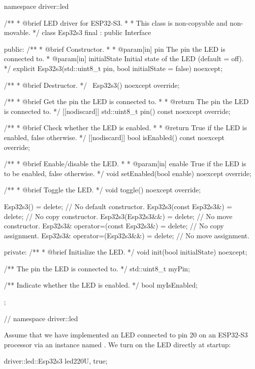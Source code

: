 \begin{cppcode}
namespace driver::led
{
/**
 * @brief LED driver for ESP32-S3.
 *
 *        This class is non-copyable and non-movable.
 */
class Esp32s3 final : public Interface
{
public:
    /**
     * @brief Constructor.
     *
     * @param[in] pin The pin the LED is connected to.
     * @param[in] initialState Initial state of the LED (default = off).
     */
    explicit Esp32s3(std::uint8_t pin, bool initialState = false) noexcept;

    /**
     * @brief Destructor.
     */
    ~Esp32s3() noexcept override;

    /**
     * @brief Get the pin the LED is connected to.
     *
     * @return The pin the LED is connected to.
     */
    [[nodiscard]] std::uint8_t pin() const noexcept override;

    /**
     * @brief Check whether the LED is enabled.
     *
     * @return True if the LED is enabled, false otherwise.
     */
    [[nodiscard]] bool isEnabled() const noexcept override;

    /**
     * @brief Enable/disable the LED.
     *
     * @param[in] enable True if the LED is to be enabled, false otherwise.
     */
    void setEnabled(bool enable) noexcept override;

    /**
     * @brief Toggle the LED.
     */
    void toggle() noexcept override;

    Esp32s3()                          = delete; // No default constructor.
    Esp32s3(const Esp32s3&)            = delete; // No copy constructor.
    Esp32s3(Esp32s3&&)                 = delete; // No move constructor.
    Esp32s3& operator=(const Esp32s3&) = delete; // No copy assignment.
    Esp32s3& operator=(Esp32s3&&)      = delete; // No move assignment.

private:
    /**
     * @brief Initialize the LED.
     */
    void init(bool initialState) noexcept;

    /** The pin the LED is connected to. */
    std::uint8_t myPin;

    /** Indicate whether the LED is enabled. */
    bool myIsEnabled;
};
} // namespace driver::led
\end{cppcode}

\noindent Assume that we have implemented an LED connected to pin 20 on an ESP32-S3 processor via an
instance named . We turn on the LED directly at startup:

\begin{cppcode}
driver::led::Esp32s3 led2{20U, true};
\end{cppcode}

